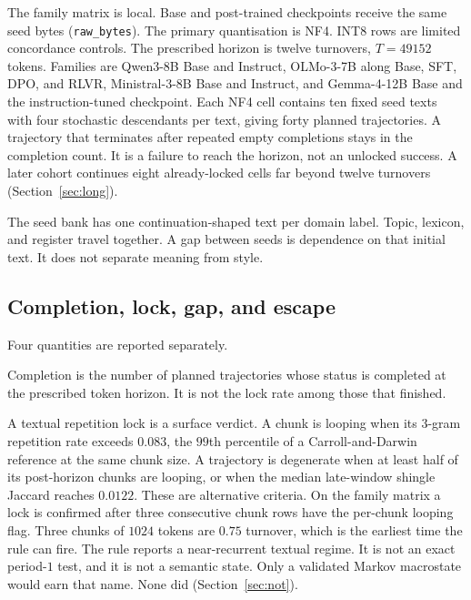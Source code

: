 \documentclass[10pt]{article}
\begin{document}
The family matrix is local.
Base and post-trained checkpoints receive the same seed bytes
(\texttt{raw\_bytes}).
The primary quantisation is NF4.
INT8 rows are limited concordance controls.
The prescribed horizon is twelve turnovers, $T{=}49152$ tokens. %
Families are Qwen3-8B Base and Instruct, OLMo-3-7B along Base, SFT,
DPO, and RLVR, Ministral-3-8B Base and Instruct, and Gemma-4-12B Base
and the instruction-tuned checkpoint.
Each NF4 cell contains ten fixed seed texts with four stochastic
descendants per text, giving forty planned trajectories. %
A trajectory that terminates after repeated empty completions stays in the completion
count.
It is a failure to reach the horizon, not an unlocked success.
A later cohort continues eight already-locked cells far beyond twelve
turnovers (Section~\ref{sec:long}).

The seed bank has one continuation-shaped text per domain label.
Topic, lexicon, and register travel together.
A gap between seeds is dependence on that initial text.
It does not separate meaning from style. %

\subsection{Completion, lock, gap, and escape}
\label{sec:measures}

Four quantities are reported separately.

Completion is the number of planned trajectories whose status is
completed at the prescribed token horizon.
It is not the lock rate among those that finished.

A textual repetition lock is a surface verdict.
A chunk is looping when its $3$-gram repetition rate exceeds $0.083$,
the $99$th percentile of a Carroll-and-Darwin reference at the same
chunk size. %
A trajectory is degenerate when at least half of its post-horizon chunks
are looping, or when the median late-window shingle Jaccard reaches
$0.0122$. %
These are alternative criteria.
On the family matrix a lock is confirmed after three consecutive
chunk rows have the per-chunk looping flag.
Three chunks of $1024$ tokens are $0.75$ turnover, which is the earliest
time the rule can fire. %
The rule reports a near-recurrent textual regime.
It is not an exact period-$1$ test, and it is not a semantic state.
Only a validated Markov macrostate would earn that name.
None did (Section~\ref{sec:not}).
\end{document}

